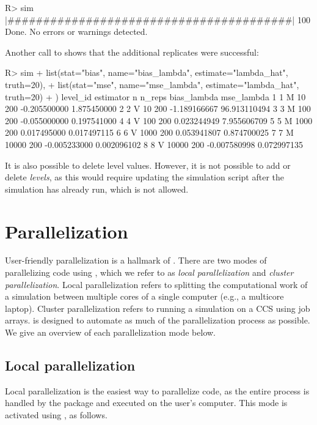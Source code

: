 \begin{example}
R> sim %
  |########################################| 100%
Done. No errors or warnings detected.
\end{example}

Another call to  shows that the additional replicates were successful:

\begin{example}
R> sim %
+    list(stat="bias", name="bias_lambda", estimate="lambda_hat", truth=20),
+    list(stat="mse", name="mse_lambda", estimate="lambda_hat", truth=20)
+  )
  level_id estimator     n n_reps  bias_lambda   mse_lambda
1        1         M    10    200 -0.205500000  1.875450000
2        2         V    10    200 -1.189166667 96.913110494
3        3         M   100    200 -0.055000000  0.197541000
4        4         V   100    200  0.023244949  7.955606709
5        5         M  1000    200  0.017495000  0.017497115
6        6         V  1000    200  0.053941807  0.874700025
7        7         M 10000    200 -0.005233000  0.002096102
8        8         V 10000    200 -0.007580998  0.072997135
\end{example}

It is also possible to delete level values. However, it is not possible to add or delete \textit{levels}, as this would require updating the simulation script after the simulation has already run, which is not allowed.

\section{Parallelization}\label{sec:parallel}

User-friendly parallelization is a hallmark of . There are two modes of parallelizing code using , which we refer to as \textit{local parallelization} and \textit{cluster parallelization}. Local parallelization refers to splitting the computational work of a simulation between multiple cores of a single computer (e.g., a multicore laptop). Cluster parallelization refers to running a simulation on a CCS using job arrays.  is designed to automate as much of the parallelization process as possible. We give an overview of each parallelization mode below.

\subsection{Local parallelization}
Local parallelization is the easiest way to parallelize code, as the entire process is handled by the package and executed on the user's computer. This mode is activated using , as follows.

